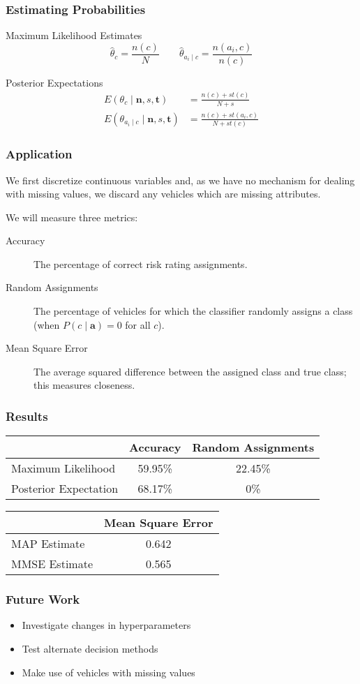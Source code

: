 \documentclass{beamer}
\begin{document}
\begin{frame}
	\frametitle{Estimating Probabilities}
	\begin{block}{Maximum Likelihood Estimates}
		\begin{equation}
			\hat{\theta}_c = \frac{n(c)}{N} \qquad \hat{\theta}_{a_i \mid c} = \frac{n(a_i, c)}{n(c)}
		\end{equation}
	\end{block}
	\begin{block}{Posterior Expectations}
		\begin{align}
			E(\theta_c \mid \mathbf{n},s,\mathbf{t}) & = \frac{n(c) + st(c)}{N + s} \\ E(\theta_{a_i \mid c} \mid \mathbf{n},s,\mathbf{t}) & = \frac{n(c) + st(a_i, c)}{N + st(c)}
		\end{align}
	\end{block}
\end{frame}

\begin{frame}
	\frametitle{Application}
	We first discretize continuous variables and, as we have no mechanism for dealing with missing values, we discard any vehicles which are missing attributes.\vspace{0.5em}

	We will measure three metrics:
	\begin{description}
		\item[Accuracy] The percentage of correct risk rating assignments.
		\item[Random Assignments] The percentage of vehicles for which the classifier randomly assigns a class (when $P(c \mid \mathbf{a}) = 0$ for all $c$).
		\item[Mean Square Error] The average squared difference between the assigned class and true class; this measures closeness.
	\end{description}
\end{frame}

\begin{frame}
	\frametitle{Results}
	\begin{center}
		\begin{tabular}{ l|c c }
			                      & Accuracy & Random Assignments\\
			\hline
			Maximum Likelihood    & 59.95\%  & 22.45\% \\
			Posterior Expectation & 68.17\%  & 0\%
		\end{tabular}
	\end{center}
	\begin{center}
		\begin{tabular}{ l|c }
			              & Mean Square Error   \\
			\hline
			MAP Estimate  & 0.642 \\
			MMSE Estimate & 0.565
		\end{tabular}
	\end{center}
\end{frame}

\begin{frame}
	\frametitle{Future Work}
	\begin{itemize}
		\item Investigate changes in hyperparameters
		\item Test alternate decision methods
		\item Make use of vehicles with missing values
	\end{itemize}
\end{frame}
 
\end{document}
